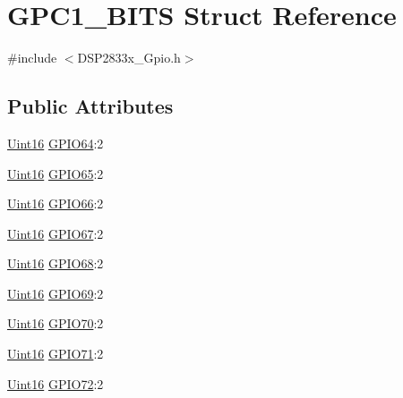 \hypertarget{struct_g_p_c1___b_i_t_s}{}\section{G\+P\+C1\+\_\+\+B\+I\+T\+S Struct Reference}
\label{struct_g_p_c1___b_i_t_s}


{\ttfamily \#include $<$D\+S\+P2833x\+\_\+\+Gpio.\+h$>$}

\subsection*{Public Attributes}
\begin{DoxyCompactItemize}
\item 
\hyperlink{_d_s_p2833x___device_8h_a59a9f6be4562c327cbfb4f7e8e18f08b}{Uint16} \hyperlink{struct_g_p_c1___b_i_t_s_a59ec77f5991c65977b0b5e053f5f9f0c}{G\+P\+I\+O64}\+:2
\item 
\hyperlink{_d_s_p2833x___device_8h_a59a9f6be4562c327cbfb4f7e8e18f08b}{Uint16} \hyperlink{struct_g_p_c1___b_i_t_s_a554aa3494dd57a80bb103153000b1584}{G\+P\+I\+O65}\+:2
\item 
\hyperlink{_d_s_p2833x___device_8h_a59a9f6be4562c327cbfb4f7e8e18f08b}{Uint16} \hyperlink{struct_g_p_c1___b_i_t_s_ab6b745e9c3753ff5040a6922433bdcd0}{G\+P\+I\+O66}\+:2
\item 
\hyperlink{_d_s_p2833x___device_8h_a59a9f6be4562c327cbfb4f7e8e18f08b}{Uint16} \hyperlink{struct_g_p_c1___b_i_t_s_afb67ca96bb4bc72db0a8f2f2d350271f}{G\+P\+I\+O67}\+:2
\item 
\hyperlink{_d_s_p2833x___device_8h_a59a9f6be4562c327cbfb4f7e8e18f08b}{Uint16} \hyperlink{struct_g_p_c1___b_i_t_s_a28851c5278e62ababa5d9761d041c8f6}{G\+P\+I\+O68}\+:2
\item 
\hyperlink{_d_s_p2833x___device_8h_a59a9f6be4562c327cbfb4f7e8e18f08b}{Uint16} \hyperlink{struct_g_p_c1___b_i_t_s_a75de2122dc061fd9a05f7b7d244598c5}{G\+P\+I\+O69}\+:2
\item 
\hyperlink{_d_s_p2833x___device_8h_a59a9f6be4562c327cbfb4f7e8e18f08b}{Uint16} \hyperlink{struct_g_p_c1___b_i_t_s_abcddc0c4e545de2f887e02fbbfffdd46}{G\+P\+I\+O70}\+:2
\item 
\hyperlink{_d_s_p2833x___device_8h_a59a9f6be4562c327cbfb4f7e8e18f08b}{Uint16} \hyperlink{struct_g_p_c1___b_i_t_s_a94aa7a2e8fda7256421050374eeb649a}{G\+P\+I\+O71}\+:2
\item 
\hyperlink{_d_s_p2833x___device_8h_a59a9f6be4562c327cbfb4f7e8e18f08b}{Uint16} \hyperlink{struct_g_p_c1___b_i_t_s_a69ff90eb7211d26581163fa637e4d6c8}{G\+P\+I\+O72}\+:2

\end{DoxyCompactItemize}
